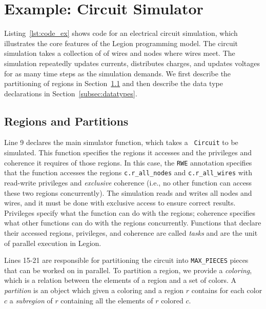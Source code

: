 \section{Example: Circuit Simulator}
\label{sec:ex}

Listing~\ref{lst:code_ex} shows code for an electrical
circuit simulation, which illustrates the core features of the Legion programming model.
The circuit simulation takes a collection of
of wires and nodes where wires meet.  
The simulation repeatedly updates
currents, distributes charges, and updates voltages for as many
time steps as the simulation demands.  We first
describe the partitioning of regions in Section~\ref{subsec:partitioning}
and then describe the data type declarations in Section~\ref{subsec:datatypes}.

\subsection{Regions and Partitions}
\label{subsec:partitioning}

Line 9 declares the main simulator function, which takes a {\tt
Circuit} to be simulated.  This function specifies the regions it 
accesses and the privileges and coherence it requires of those regions.
In this case, the {\tt RWE} annotation specifies that the function
accesses the regions {\tt c.r\_all\_nodes} and {\tt c.r\_all\_wires}
with read-write privileges and {\em exclusive} coherence (i.e., no other
function can access these two regions concurrently).  The simulation 
reads and writes all nodes and wires, and it must be done
with exclusive access to ensure correct results.  Privileges specify what
the function can do with the regions; coherence specifies what other
functions can do with the regions concurrently.  Functions that
declare their accessed regions, privileges, and coherence are called {\em tasks}
and are the unit of parallel execution in Legion.

Lines 15-21 are responsible for partitioning the circuit into {\tt MAX\_PIECES}
pieces that can be worked on in parallel.  To partition a region, we
provide a {\em coloring}, which is a relation between the elements
of a region and a set of colors.  A {\em partition} is an object which given
a coloring and a region $r$ contains for each color $c$ a {\em subregion} of $r$
containing all the elements of $r$ colored $c$.

